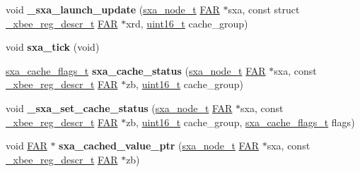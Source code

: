 \begin{DoxyCompactItemize}
\item 
\mbox{\label{group___s_x_a_ga81312d0cecb0cac7d7677b0daab1a38a}} 
void {\bfseries \+\_\+sxa\+\_\+launch\+\_\+update} (\hyperlink{structsxa__node__t}{sxa\+\_\+node\+\_\+t} \hyperlink{group__hal_gaef060b3456fdcc093a7210a762d5f2ed}{F\+AR} $\ast$sxa, const struct \hyperlink{struct__xbee__reg__descr__t}{\+\_\+xbee\+\_\+reg\+\_\+descr\+\_\+t} \hyperlink{group__hal_gaef060b3456fdcc093a7210a762d5f2ed}{F\+AR} $\ast$xrd, \hyperlink{group__hal__dos_ga5a8b2dc9e45a9ee81a94ef304fb62505}{uint16\+\_\+t} cache\+\_\+group)
\item 
\mbox{\label{group___s_x_a_ga4d338eecde830dfb7301886e30dd8afd}} 
void {\bfseries sxa\+\_\+tick} (void)
\item 
\mbox{\label{group___s_x_a_gabbf7dbee8c4abf56830494ada37783a0}} 
\hyperlink{group___s_x_a_ga21b45e50d83fcc1363c4239313e88c06}{sxa\+\_\+cache\+\_\+flags\+\_\+t} {\bfseries sxa\+\_\+cache\+\_\+status} (\hyperlink{structsxa__node__t}{sxa\+\_\+node\+\_\+t} \hyperlink{group__hal_gaef060b3456fdcc093a7210a762d5f2ed}{F\+AR} $\ast$sxa, const \hyperlink{struct__xbee__reg__descr__t}{\+\_\+xbee\+\_\+reg\+\_\+descr\+\_\+t} \hyperlink{group__hal_gaef060b3456fdcc093a7210a762d5f2ed}{F\+AR} $\ast$zb, \hyperlink{group__hal__dos_ga5a8b2dc9e45a9ee81a94ef304fb62505}{uint16\+\_\+t} cache\+\_\+group)
\item 
\mbox{\label{group___s_x_a_ga99d0aaec6a2a702f2ee9a73ac985f3ae}} 
void {\bfseries \+\_\+sxa\+\_\+set\+\_\+cache\+\_\+status} (\hyperlink{structsxa__node__t}{sxa\+\_\+node\+\_\+t} \hyperlink{group__hal_gaef060b3456fdcc093a7210a762d5f2ed}{F\+AR} $\ast$sxa, const \hyperlink{struct__xbee__reg__descr__t}{\+\_\+xbee\+\_\+reg\+\_\+descr\+\_\+t} \hyperlink{group__hal_gaef060b3456fdcc093a7210a762d5f2ed}{F\+AR} $\ast$zb, \hyperlink{group__hal__dos_ga5a8b2dc9e45a9ee81a94ef304fb62505}{uint16\+\_\+t} cache\+\_\+group, \hyperlink{group___s_x_a_ga21b45e50d83fcc1363c4239313e88c06}{sxa\+\_\+cache\+\_\+flags\+\_\+t} flags)
\item 
\mbox{\label{group___s_x_a_gaf30ed0cbc76c65f737aa24272fd6f8c7}} 
void \hyperlink{group__hal_gaef060b3456fdcc093a7210a762d5f2ed}{F\+AR} $\ast$ {\bfseries sxa\+\_\+cached\+\_\+value\+\_\+ptr} (\hyperlink{structsxa__node__t}{sxa\+\_\+node\+\_\+t} \hyperlink{group__hal_gaef060b3456fdcc093a7210a762d5f2ed}{F\+AR} $\ast$sxa, const \hyperlink{struct__xbee__reg__descr__t}{\+\_\+xbee\+\_\+reg\+\_\+descr\+\_\+t} \hyperlink{group__hal_gaef060b3456fdcc093a7210a762d5f2ed}{F\+AR} $\ast$zb)

\end{DoxyCompactItemize}
